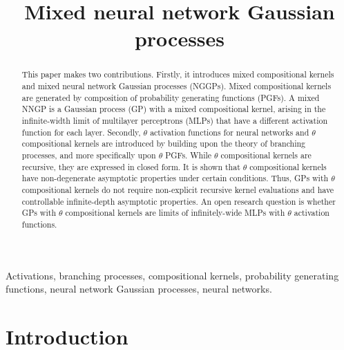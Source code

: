 \documentclass[final, 12pt]{colt2021} %
\title[Mixed neural network Gaussian processes]
{Mixed neural network Gaussian processes}
\begin{document}
\maketitle

\begin{abstract}%

This paper makes two contributions.
Firstly, it introduces
mixed compositional kernels and
mixed neural network Gaussian processes (NGGPs).
Mixed compositional kernels are
generated by
composition of probability generating functions (PGFs).
A mixed NNGP is a Gaussian process (GP)
with a mixed compositional kernel,
arising in the infinite-width limit of
multilayer perceptrons (MLPs)
that have a different activation function for each layer.
Secondly,
$\theta$ activation functions for neural networks and
$\theta$ compositional kernels are introduced
by building upon the theory of branching processes,
and more specifically upon $\theta$ PGFs.
While $\theta$ compositional kernels are recursive,
they are expressed in closed form.
It is shown that
$\theta$ compositional kernels
have non-degenerate asymptotic properties under certain conditions.
Thus, GPs with $\theta$ compositional kernels
do not require non-explicit recursive kernel evaluations
and have controllable infinite-depth asymptotic properties.
An open research question is whether GPs with $\theta$ compositional kernels
are limits of infinitely-wide MLPs with $\theta$ activation functions.

\end{abstract}

\begin{keywords}%
Activations,
branching processes,
compositional kernels,
probability generating functions,
neural network Gaussian processes,
neural networks.%
\end{keywords}

\section{Introduction}
\end{document}
